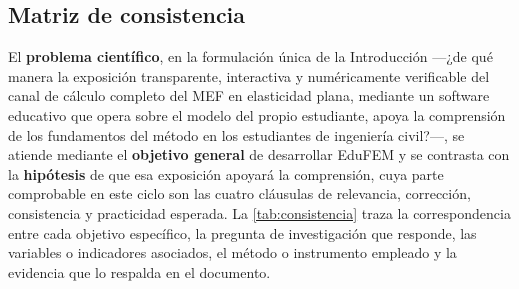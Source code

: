 \subsection{Matriz de consistencia}
\label{sec:matriz-consistencia}

El \textbf{problema científico}, en la formulación única de la Introducción —¿de qué manera la exposición transparente, interactiva y numéricamente verificable del canal de cálculo completo del MEF en elasticidad plana, mediante un software educativo que opera sobre el modelo del propio estudiante, apoya la comprensión de los fundamentos del método en los estudiantes de ingeniería civil?—, se atiende mediante el \textbf{objetivo general} de desarrollar EduFEM y se contrasta con la \textbf{hipótesis} de que esa exposición apoyará la comprensión, cuya parte comprobable en este ciclo son las cuatro cláusulas de relevancia, corrección, consistencia y practicidad esperada. La \autoref{tab:consistencia} traza la correspondencia entre cada objetivo específico, la pregunta de investigación que responde, las variables o indicadores asociados, el método o instrumento empleado y la evidencia que lo respalda en el documento.

